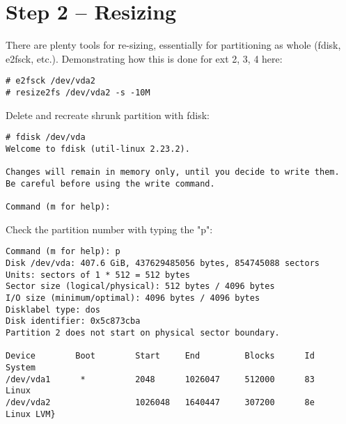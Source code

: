 \section{Step 2 -- Resizing}
There are plenty tools for re-sizing, essentially for partitioning as whole (fdisk, e2fsck, etc.).
Demonstrating how this is done for ext 2, 3, 4 here:
\begin{lstlisting}[columns=fixed,basicstyle=\ttfamily\footnotesize,tabsize=4,backgroundcolor=\color{yellow!10}]
# e2fsck /dev/vda2
# resize2fs /dev/vda2 -s -10M
\end{lstlisting}
Delete and recreate shrunk partition with fdisk:
\begin{lstlisting}[columns=fixed,basicstyle=\ttfamily\footnotesize,tabsize=4,backgroundcolor=\color{yellow!10}]
# fdisk /dev/vda
Welcome to fdisk (util-linux 2.23.2).

Changes will remain in memory only, until you decide to write them.
Be careful before using the write command.

Command (m for help):
\end{lstlisting}
Check the partition number with typing the "p":
\begin{lstlisting}[columns=fixed,basicstyle=\ttfamily\footnotesize,tabsize=4,backgroundcolor=\color{yellow!10}]
Command (m for help): p
Disk /dev/vda: 407.6 GiB, 437629485056 bytes, 854745088 sectors
Units: sectors of 1 * 512 = 512 bytes
Sector size (logical/physical): 512 bytes / 4096 bytes
I/O size (minimum/optimal): 4096 bytes / 4096 bytes
Disklabel type: dos
Disk identifier: 0x5c873cba
Partition 2 does not start on physical sector boundary.

Device        Boot        Start     End         Blocks      Id    System
/dev/vda1      *          2048      1026047     512000      83    Linux
/dev/vda2                 1026048   1640447     307200      8e    Linux LVM}
\end{lstlisting}



